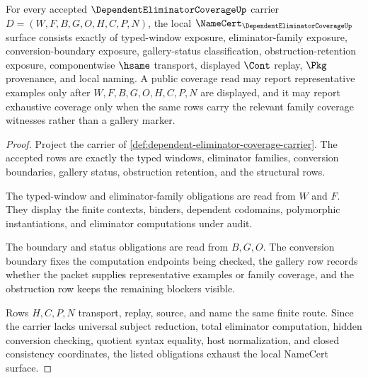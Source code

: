 \begin{theorem}\label{thm:dependent-eliminator-coverage-namecert-obligations}
For every accepted $\DependentEliminatorCoverageUp$ carrier $D=(W,F,B,G,O,H,C,P,N)$, the local $\NameCert_{\DependentEliminatorCoverageUp}$ surface consists exactly of typed-window exposure, eliminator-family exposure, conversion-boundary exposure, gallery-status classification, obstruction-retention exposure, componentwise $\hsame$ transport, displayed $\Cont$ replay, $\Pkg$ provenance, and local naming. A public coverage read may report representative examples only after $W,F,B,G,O,H,C,P,N$ are displayed, and it may report exhaustive coverage only when the same rows carry the relevant family coverage witnesses rather than a gallery marker.
\end{theorem}
\begin{proof}
Project the carrier of \autoref{def:dependent-eliminator-coverage-carrier}. The accepted rows are exactly the typed windows, eliminator families, conversion boundaries, gallery status, obstruction retention, and the structural rows.

The typed-window and eliminator-family obligations are read from $W$ and $F$. They display the finite contexts, binders, dependent codomains, polymorphic instantiations, and eliminator computations under audit.

The boundary and status obligations are read from $B,G,O$. The conversion boundary fixes the computation endpoints being checked, the gallery row records whether the packet supplies representative examples or family coverage, and the obstruction row keeps the remaining blockers visible.

Rows $H,C,P,N$ transport, replay, source, and name the same finite route. Since the carrier lacks universal subject reduction, total eliminator computation, hidden conversion checking, quotient syntax equality, host normalization, and closed consistency coordinates, the listed obligations exhaust the local NameCert surface.
\end{proof}

